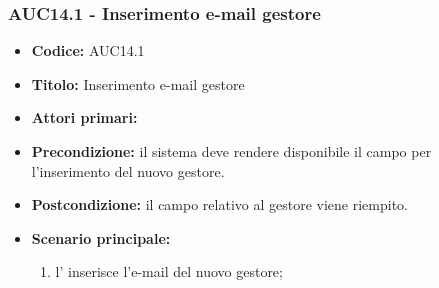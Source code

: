 \documentclass[casi-duso]{subfiles}
\begin{document}
\subsubsection{AUC14.1 - Inserimento e-mail gestore}%
\label{subsub:AUC14.1}
\begin{itemize}
  \item \textbf{Codice:} AUC14.1
  \item \textbf{Titolo:} Inserimento e-mail gestore
  \item \textbf{Attori primari:} 
  \item \textbf{Precondizione:} il sistema deve rendere disponibile il campo per l'inserimento del nuovo gestore.
  \item \textbf{Postcondizione:} il campo relativo al gestore viene riempito.
  \item \textbf{Scenario principale:} 
  \begin{enumerate}
    \item l'  inserisce l'e-mail del nuovo gestore;
  \end{enumerate}
\end{itemize}



\end{document}
